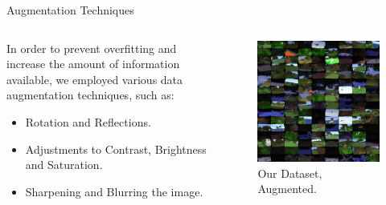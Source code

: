 \documentclass[english]{beamer}
\begin{document}
\begin{frame}{Augmentation Techniques}
  \begin{columns}
    
    \begin{column}{0.5\textwidth}
      In order to prevent overfitting and increase the amount of information available, we employed various 
      data augmentation techniques, such as:
      \begin{itemize}
        \item Rotation and Reflections.
        \item Adjustments to Contrast, Brightness and Saturation.
        \item Sharpening and Blurring the image.
      \end{itemize}
    \end{column}

    \begin{column}{0.5\textwidth}
      \begin{figure}
        \centering
            \includegraphics[width=1.0\textwidth]{../images/dtset_repr_mod.png}
            \caption{Our Dataset, Augmented.}
        \end{figure}
    \end{column}

  \end{columns}
\end{frame}
\end{document}
